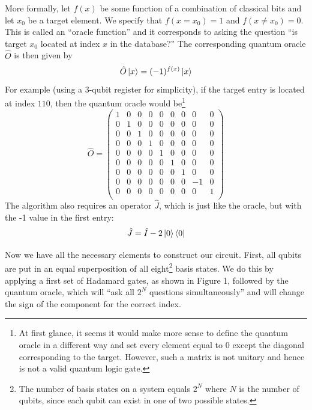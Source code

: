 \documentclass{article}[11pt]
\begin{document}
More formally, let $f(x)$ be some function of a combination of classical bits and let $x_0$ be a target element. We specify that $f(x=x_0)=1$ and $f(x\neq x_0)=0$. This is called an ``oracle function'' and it corresponds to asking the question ``is target $x_0$ located at index $x$ in the database?'' The corresponding quantum oracle $\hat O$ is then given by
\begin{equation}
\hat O\ket x = (-1)^{f(x)}\ket x
\end{equation}
For example (using a 3-qubit register for simplicity), if the target entry is located at index $110$, then the quantum oracle would be\footnote{At first glance, it seems it would make more sense to define the quantum oracle in a different way and set every element equal to $0$ except the diagonal corresponding to the target. However, such a matrix is not unitary and hence is not a valid quantum logic gate.}
\begin{equation} \hat{O}= \begin{pmatrix}
1 & 0 & 0 & 0 & 0 & 0 & 0 & 0 & 0\\
0 & 1 & 0 & 0 & 0 & 0 & 0 & 0 & 0\\
0 & 0 & 1 & 0 & 0 & 0 & 0 & 0 & 0\\
0 & 0 & 0 & 1 & 0 & 0 & 0 & 0 & 0\\
0 & 0 & 0 & 0 & 1 & 0 & 0 & 0 & 0\\
0 & 0 & 0 & 0 & 0 & 1 & 0 & 0 & 0\\
0 & 0 & 0 & 0 & 0 & 0 & 1 & 0 & 0\\
0 & 0 & 0 & 0 & 0 & 0 & 0 & -1 & 0\\
0 & 0 & 0 & 0 & 0 & 0 & 0 & 0 & 1\\
\end{pmatrix}\end{equation}
The algorithm also requires an operator $\hat{J}$, which is just like the oracle, but with the -1 value in the first entry:\cite{candela}
\begin{equation}
\hat J = \hat I-2\ket{0}\bra{0}
\end{equation}

Now we have all the necessary elements to construct our circuit. First, all qubits are put in an equal superposition of all eight\footnote{The number of basis states on a system equals $2^N$ where $N$ is the number of qubits, since each qubit can exist in one of two possible states.} basis states. We do this by applying a first set of Hadamard gates, as shown in Figure 1, followed by the quantum oracle, which will ``ask all $2^N$ questions simultaneously'' and will change the sign of the component for the correct index.
\end{document}
